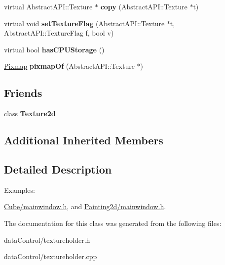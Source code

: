 \begin{DoxyCompactItemize}
\item 
\hypertarget{class_tempest_1_1_texture_holder_aba0c9b417380469b9717e6dcb2f6fa47}{virtual Abstract\+A\+P\+I\+::\+Texture $\ast$ {\bfseries copy} (Abstract\+A\+P\+I\+::\+Texture $\ast$t)}\label{class_tempest_1_1_texture_holder_aba0c9b417380469b9717e6dcb2f6fa47}

\item 
\hypertarget{class_tempest_1_1_texture_holder_a5b29e4b4dd293c49dc8076bf3ad6fb5c}{virtual void {\bfseries set\+Texture\+Flag} (Abstract\+A\+P\+I\+::\+Texture $\ast$t, Abstract\+A\+P\+I\+::\+Texture\+Flag f, bool v)}\label{class_tempest_1_1_texture_holder_a5b29e4b4dd293c49dc8076bf3ad6fb5c}

\item 
\hypertarget{class_tempest_1_1_texture_holder_adea619146bb438481a1e62c97e4d839b}{virtual bool {\bfseries has\+C\+P\+U\+Storage} ()}\label{class_tempest_1_1_texture_holder_adea619146bb438481a1e62c97e4d839b}

\item 
\hypertarget{class_tempest_1_1_texture_holder_a2aa88a315f2b28d735bf5fdc8a0277dd}{\hyperlink{class_tempest_1_1_pixmap}{Pixmap} {\bfseries pixmap\+Of} (Abstract\+A\+P\+I\+::\+Texture $\ast$)}\label{class_tempest_1_1_texture_holder_a2aa88a315f2b28d735bf5fdc8a0277dd}

\end{DoxyCompactItemize}
\subsection*{Friends}
\begin{DoxyCompactItemize}
\item 
\hypertarget{class_tempest_1_1_texture_holder_ac3dfd69a23460a096606c4ef4062d038}{class {\bfseries Texture2d}}\label{class_tempest_1_1_texture_holder_ac3dfd69a23460a096606c4ef4062d038}

\end{DoxyCompactItemize}
\subsection*{Additional Inherited Members}


\subsection{Detailed Description}
\begin{Desc}
\item[Examples\+: ]\par
\hyperlink{_cube_2mainwindow_8h-example}{Cube/mainwindow.\+h}, and \hyperlink{_painting2d_2mainwindow_8h-example}{Painting2d/mainwindow.\+h}.\end{Desc}


The documentation for this class was generated from the following files\+:\begin{DoxyCompactItemize}
\item 
data\+Control/textureholder.\+h\item 
data\+Control/textureholder.\+cpp\end{DoxyCompactItemize}
